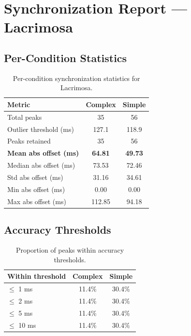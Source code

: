 
\section*{Synchronization Report --- Lacrimosa}

\subsection*{Per-Condition Statistics}

\begin{table}[h!]
\centering
\begin{tabular}{|l|c|c|}
\hline
Metric & Complex & Simple \\
\hline
Total peaks & 35 & 56 \\
Outlier threshold (ms) & 127.1 & 118.9 \\
Peaks retained & 35 & 56 \\
\textbf{Mean abs offset (ms)} & \textbf{64.81} & \textbf{49.73} \\
Median abs offset (ms) & 73.53 & 72.46 \\
Std abs offset (ms) & 31.16 & 34.61 \\
Min abs offset (ms) & 0.00 & 0.00 \\
Max abs offset (ms) & 112.85 & 94.18 \\
\hline
\end{tabular}
\caption{Per-condition synchronization statistics for Lacrimosa.}
\label{tab:sync_stats}
\end{table}

\subsection*{Accuracy Thresholds}

\begin{table}[h!]
\centering
\begin{tabular}{|l|c|c|}
\hline
Within threshold & Complex & Simple \\
\hline
$\leq$ 1 ms & 11.4\% & 30.4\% \\
$\leq$ 2 ms & 11.4\% & 30.4\% \\
$\leq$ 5 ms & 11.4\% & 30.4\% \\
$\leq$ 10 ms & 11.4\% & 30.4\% \\
\hline
\end{tabular}
\caption{Proportion of peaks within accuracy thresholds.}
\label{tab:sync_accuracy}
\end{table}


